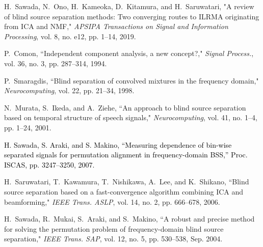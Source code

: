 \documentclass[honka]{nitkagawathesis}%
\newcommand{\red}[1]{\textcolor{black}{#1}}
\begin{document}






\backmatter



\begin{thebibliography}{99}
  
  H.~Sawada, N.~Ono, H.~Kameoka, D.~Kitamura, and H.~Saruwatari, "A review of blind source separation methods: Two converging routes to ILRMA originating from ICA and NMF," {\em APSIPA Transactions on Signal and Information Processing}, vol. 8, no. e12, pp. 1–14, 2019.
  
  P.~Comon, ``Independent component analysis, a new concept?," {\em Signal Process.}, vol. 36, no. 3, pp. 287--314, 1994.
  
  P.~Smaragdis, ``Blind separation of convolved mixtures in the frequency domain," {\em Neurocomputing}, vol. 22, pp. 21--34, 1998.
  
  N.~Murata, S.~Ikeda, and A.~Ziehe, ``An approach to blind source separation based on temporal structure of speech signals,"  {\em Neurocomputing}, vol. 41, no. 1–4, pp. 1--24, 2001.
  
  \red{H. Sawada, S. Araki, and S. Makino, ``Measuring dependence of bin-wise separated signals for permutation alignment in frequency-domain BSS,'' Proc. ISCAS, pp. 3247--3250, 2007.}
  
  H.~Saruwatari, T.~Kawamura, T.~Nishikawa, A.~Lee, and K.~Shikano, ``Blind source separation based on a fast-convergence algorithm combining ICA and beamforming,"  {\em IEEE Trans. ASLP}, vol. 14, no. 2, pp. 666--678, 2006.
  
  H.~Sawada, R.~Mukai, S.~Araki, and S.~Makino, ``A robust and precise method for solving the permutation problem of frequency-domain blind source separation,"  {\em IEEE Trans. SAP}, vol. 12, no. 5, pp. 530--538, Sep. 2004.
  

\end{thebibliography}
\end{document}
